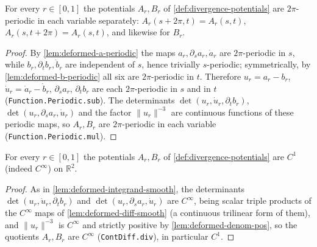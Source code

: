 \begin{lemma}
    \label{lem:deformed-potentials-periodicity}
    For every $r\in[0,1]$ the potentials $A_r,B_r$ of
    \cref{def:divergence-potentials} are $2\pi$-periodic in each variable separately:
    $A_r(s+2\pi,t)=A_r(s,t)$, $A_r(s,t+2\pi)=A_r(s,t)$, and likewise for $B_r$.
\end{lemma}
\begin{proof}
    By \cref{lem:deformed-a-periodic} the maps $a_r,\partial_s a_r,\dot a_r$ are
    $2\pi$-periodic in $s$, while $b_r,\partial_t b_r,\dot b_r$ are independent of
    $s$, hence trivially $s$-periodic; symmetrically, by
    \cref{lem:deformed-b-periodic} all six are $2\pi$-periodic in $t$. Therefore
    $u_r=a_r-b_r$, $\dot u_r=\dot a_r-\dot b_r$, $\partial_s a_r$, $\partial_t b_r$
    are each $2\pi$-periodic in $s$ and in $t$ (\texttt{Function.Periodic.sub}). The
    determinants $\det(u_r,\dot u_r,\partial_t b_r)$,
    $\det(u_r,\partial_s a_r,\dot u_r)$ and the factor $\lVert u_r\rVert^{-3}$ are
    continuous functions of these periodic maps, so $A_r,B_r$ are $2\pi$-periodic in
    each variable (\texttt{Function.Periodic.mul}).
\end{proof}

\begin{lemma}
    \label{lem:deformed-potentials-regularity}
    For every $r\in[0,1]$ the potentials $A_r,B_r$ of
    \cref{def:divergence-potentials} are $C^1$ (indeed $C^\infty$) on $\mathbb{R}^2$.
\end{lemma}
\begin{proof}
    As in \cref{lem:deformed-integrand-smooth}, the determinants
    $\det(u_r,\dot u_r,\partial_t b_r)$ and $\det(u_r,\partial_s a_r,\dot u_r)$ are
    $C^\infty$, being scalar triple products of the $C^\infty$ maps of
    \cref{lem:deformed-diff-smooth} (a continuous trilinear form of them), and
    $\lVert u_r\rVert^{-3}$ is $C^\infty$ and strictly positive by
    \cref{lem:deformed-denom-pos}, so the quotients $A_r,B_r$ are $C^\infty$
    (\texttt{ContDiff.div}), in particular $C^1$.
\end{proof}

